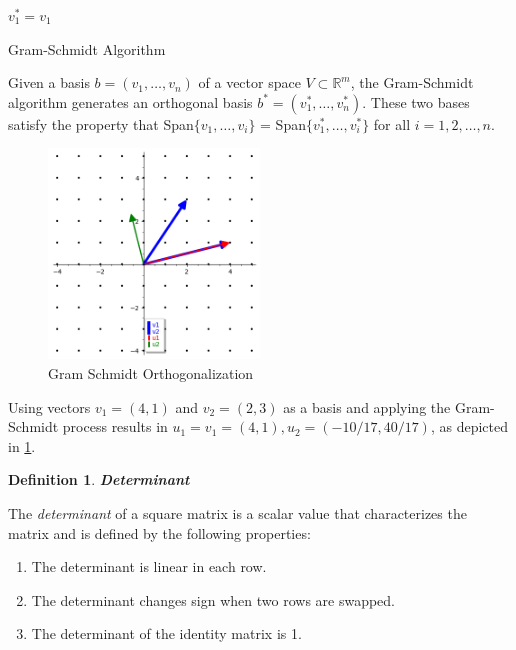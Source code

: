 \documentclass[a4paper,12pt]{report}
\newtheorem{definition}{Definition}[section]
\newcommand{\R}{\mathbb{R}}
\begin{document}
\begin{algorithm}[H]
    \vspace*{5px}
    $v_1^* = v_1$\;
    \\
    \caption{Gram-Schmidt Algorithm}
    \label{alg:gram_schmidt}
\end{algorithm}

Given a basis $b = (v_1, \ldots, v_n)$ of a vector space $V \subset \R^m$, the Gram-Schmidt algorithm generates an orthogonal basis $b^* = (v_1^*,\ldots,v_n^*)$. These two bases satisfy the property that Span$\{v_1,\ldots,v_i\}$ = Span$\{v_1^*,\ldots,v_i^*\}$ for all $i = 1,2,\ldots,n$.

\begin{figure}[htpb]
    \centering
    \includegraphics[width=0.5\textwidth]{./img/gram_schmidt.png}
    \caption{Gram Schmidt Orthogonalization}
    \label{fig:gram_schmidt}
\end{figure}

Using vectors $v_1=(4, 1)$ and $v_2=(2, 3)$ as a basis and applying the Gram-Schmidt process results in $u_1=v_1=(4, 1), u_2=(-10/17, 40/17)$, as depicted in \ref{fig:gram_schmidt}.

\begin{definition}
    \textbf{Determinant}
\end{definition}

The \textit{determinant} of a square matrix is a scalar value that characterizes the matrix and is defined by the following properties:

\begin{enumerate}
    \item The determinant is linear in each row.
    \item The determinant changes sign when two rows are swapped.
    \item The determinant of the identity matrix is 1.
\end{enumerate}
\end{document}
